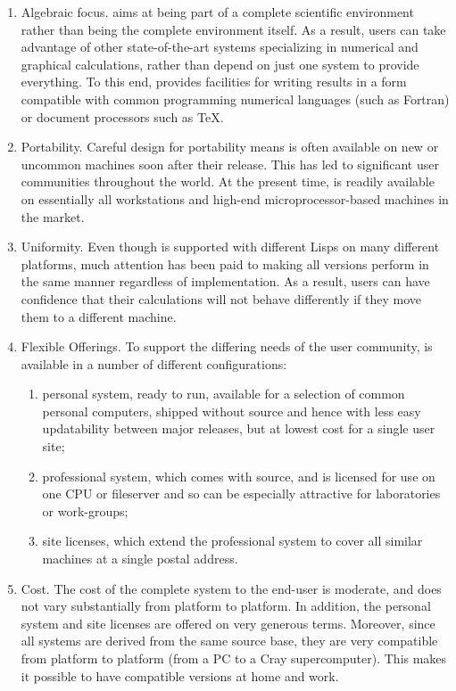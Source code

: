 \begin{enumerate}
\item Algebraic focus.  {\REDUCE} aims at being part of a complete scientific
environment rather than being the complete environment itself.  As a
result, users can take advantage of other state-of-the-art systems
specializing in numerical and graphical calculations, rather than depend
on just one system to provide everything.  To this end, {\REDUCE} provides
facilities for writing results in a form compatible with common
programming numerical languages (such as Fortran) or document processors
such as TeX.

\item Portability.  Careful design for portability means {\REDUCE} is often
available on new or uncommon machines soon after their release.  This has
led to significant user communities throughout the world.  At the present
time, {\REDUCE} is readily available on essentially all workstations and
high-end microprocessor-based machines in the market.

\item Uniformity.  Even though {\REDUCE} is supported with different Lisps
on many different platforms, much attention has been paid to making all
versions perform in the same manner regardless of implementation.  As a
result, users can have confidence that their calculations will not behave
differently if they move them to a different machine.

\item Flexible Offerings.  To support the differing needs of the user
community, {\REDUCE} is available in a number of different configurations:

\begin{enumerate}
\item personal system, ready to run, available for a selection of common
personal computers, shipped without source and hence with less easy
updatability between major releases, but at lowest cost for a single user
site;

\item professional system, which comes with source, and is licensed for
use on one CPU or fileserver and so can be especially attractive for
laboratories or work-groups;

\item site licenses, which extend the professional system to cover all
similar machines at a single postal address.
\end{enumerate}

\item Cost.  The cost of the complete {\REDUCE} system to the end-user is
moderate, and does not vary substantially from platform to platform.  In
addition, the personal system and site licenses are offered on very
generous terms.  Moreover, since all systems are derived from the same
source base, they are very compatible from platform to platform (from a PC
to a Cray supercomputer).  This makes it possible to have compatible
versions at home and work.
\end{enumerate}

